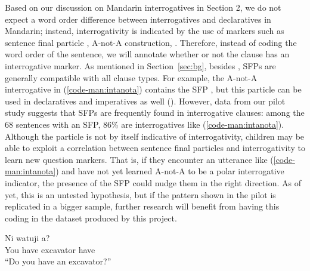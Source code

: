 Based on our discussion on Mandarin interrogatives in Section 2, we do not expect a word order difference between interrogatives and declaratives in Mandarin; instead, interrogativity is indicated by the use of markers such as sentence final particle \ma{}, A-not-A construction, \twh{}. Therefore, instead of coding the word order of the sentence, we will annotate whether or not the clause has an interrogative marker. As mentioned in Section~\ref{sec:bg}, besides \ma{}, SFPs are generally compatible with all clause types. For example, the A-not-A interrogative in (\ref{code-man:intanota}) contains the SFP , but this particle can be used in declaratives and imperatives as well (\citealt{chao1968, lithompson}). However, data from our pilot study suggests that SFPs are frequently found in interrogative clauses: among the 68 sentences with an SFP, 86\% are interrogatives like (\ref{code-man:intanota}). Although the particle  is not by itself indicative of interrogativity, children may be able to exploit a correlation between sentence final particles and interrogativity to learn new question markers. That is, if they encounter an utterance like (\ref{code-man:intanota}) and have not yet learned A-not-A to be a polar interrogative indicator, the presence of the SFP  could nudge them in the right direction. As of yet, this is an untested hypothesis, but if the pattern shown in the pilot is replicated in a bigger sample, further research will benefit from having this coding in the dataset produced by this project.


\gll Ni		watuji		a?	\\
You have	excavator	{\Neg{}	have}	\Sfp\\
``Do you have an excavator?'' \hfill {}
\eex



